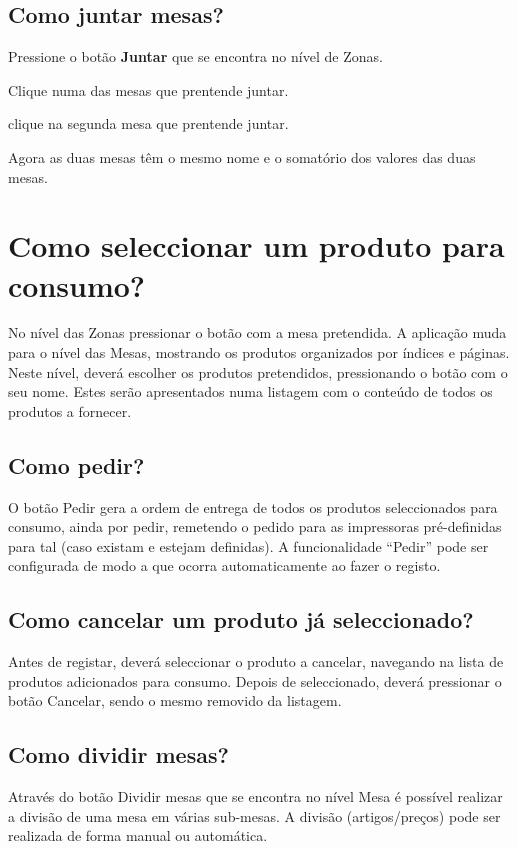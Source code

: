 \documentclass[a4paper,11pt,openany]{memoir}
\begin{document}
\subsection{Como juntar mesas?}

Pressione o botão \textbf{Juntar} que se encontra no nível de Zonas.

Clique numa das mesas que prentende juntar.

clique na segunda mesa que prentende juntar.

Agora as duas mesas têm o mesmo nome e o somatório dos valores das duas mesas.

\section{Como seleccionar um produto para consumo?}

No nível das Zonas pressionar o botão com a mesa pretendida. A aplicação muda
para o nível das Mesas, mostrando os produtos organizados por índices e páginas.
Neste nível, deverá escolher os produtos pretendidos, pressionando o botão com o
seu nome. Estes serão apresentados numa listagem com o conteúdo de todos os
produtos a fornecer.


\subsection{Como pedir?}
O botão Pedir gera a ordem de entrega de todos os produtos seleccionados para
consumo, ainda por pedir, remetendo o pedido para as impressoras pré-definidas
para tal (caso existam e estejam definidas). A funcionalidade “Pedir” pode ser
configurada de modo a que ocorra automaticamente ao fazer o registo.

\subsection{Como cancelar um produto já seleccionado?}
Antes de registar, deverá seleccionar o produto a cancelar, navegando na lista de
produtos adicionados para consumo. Depois de seleccionado, deverá pressionar o
botão Cancelar, sendo o mesmo removido da listagem.


\subsection{Como dividir mesas?}
Através do botão Dividir mesas que se encontra no nível Mesa é possível realizar a
divisão de uma mesa em várias sub-mesas. A divisão (artigos/preços) pode ser
realizada de forma manual ou automática.
\end{document}
